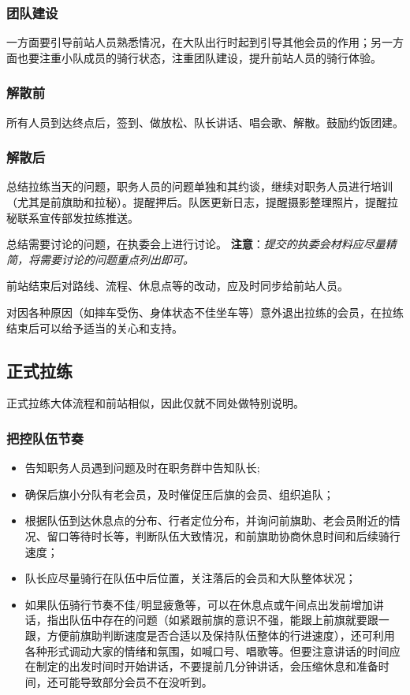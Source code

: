 \documentclass[UTF8]{ctexart}
\begin{document}
\subsubsection{团队建设}

一方面要引导前站人员熟悉情况，在大队出行时起到引导其他会员的作用；另一方面也要注重小队成员的骑行状态，注重团队建设，提升前站人员的骑行体验。

\subsubsection{解散前}

所有人员到达终点后，签到、做放松、队长讲话、唱会歌、解散。鼓励约饭团建。

\subsubsection{解散后}

总结拉练当天的问题，职务人员的问题单独和其约谈，继续对职务人员进行培训（尤其是前旗助和拉秘）。提醒押后。队医更新日志，提醒摄影整理照片，提醒拉秘联系宣传部发拉练推送。

总结需要讨论的问题，在执委会上进行讨论。
\textbf{注意}：\textit{提交的执委会材料应尽量精简，将需要讨论的问题重点列出即可。}

前站结束后对路线、流程、休息点等的改动，应及时同步给前站人员。

对因各种原因（如摔车受伤、身体状态不佳坐车等）意外退出拉练的会员，在拉练结束后可以给予适当的关心和支持。

\subsection{正式拉练}

正式拉练大体流程和前站相似，因此仅就不同处做特别说明。

\subsubsection{把控队伍节奏}

\begin{itemize}[nosep,left=2em]
    \item 告知职务人员遇到问题及时在职务群中告知队长;
    \item 确保后旗小分队有老会员，及时催促压后旗的会员、组织追队；
    \item 根据队伍到达休息点的分布、行者定位分布，并询问前旗助、老会员附近的情况、留口等待时长等，判断队伍大致情况，和前旗助协商休息时间和后续骑行速度；
    \item 队长应尽量骑行在队伍中后位置，关注落后的会员和大队整体状况；
    \item 如果队伍骑行节奏不佳/明显疲惫等，可以在休息点或午间点出发前增加讲话，指出队伍中存在的问题（如紧跟前旗的意识不强，能跟上前旗就要跟一跟，方便前旗助判断速度是否合适以及保持队伍整体的行进速度），还可利用各种形式调动大家的情绪和氛围，如喊口号、唱歌等。但要注意讲话的时间应在制定的出发时间时开始讲话，不要提前几分钟讲话，会压缩休息和准备时间，还可能导致部分会员不在没听到。
\end{itemize}
\end{document}
